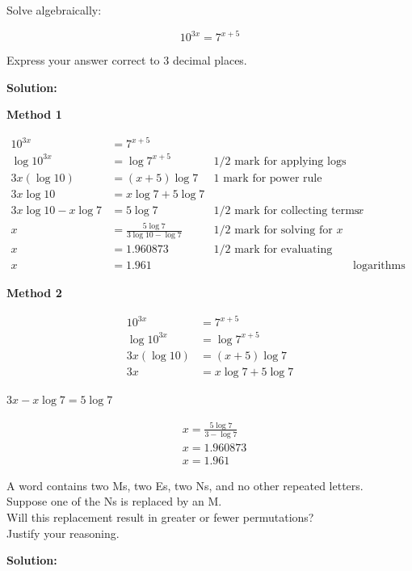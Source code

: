 \documentclass[12pt,addpoints,answers]{exam}
\begin{document}
\begin{questions}
\question
\leavevmode
Solve algebraically:

$$
10^{3 x}=7^{x+5}
$$

Express your answer correct to 3 decimal places.
\begin{solution}
\textbf{Solution:}\par

\textbf{Method 1}\par
$$
\begin{array}{rlrl}
10^{3 x} & =7^{x+5} & \\
\log 10^{3 x} & =\log 7^{x+5} & 1 / 2 \text { mark for applying logs } \\
3 x(\log 10) & =(x+5) \log 7 & 1 \text { mark for power rule } & \\
3 x \log 10 & =x \log 7+5 \log 7 & & \\
3 x \log 10-x \log 7 & =5 \log 7 & 1 / 2 \text { mark for collecting terms with } x & \\
x & =\frac{5 \log 7}{3 \log 10-\log 7} & 1 / 2 \text { mark for solving for } x \\
x & =1.960873 & 1 / 2 \text { mark for evaluating quotient of } \\
x & =1.961 & & \text { logarithms }
\end{array}
$$


\textbf{Method 2}\par
$$
\begin{aligned}
10^{3 x} & =7^{x+5} \\
\log 10^{3 x} & =\log 7^{x+5} \\
3 x(\log 10) & =(x+5) \log 7 \\
3 x & =x \log 7+5 \log 7
\end{aligned}
$$

$3 x-x \log 7=5 \log 7$

$$
\begin{aligned}
& x=\frac{5 \log 7}{3-\log 7} \\
& x=1.960873 \\
& x=1.961
\end{aligned}
$$
\end{solution}

\question
\leavevmode
A word contains two Ms, two Es, two Ns, and no other repeated letters.\\
Suppose one of the Ns is replaced by an M.\\
Will this replacement result in greater or fewer permutations?\\
Justify your reasoning.
\begin{solution}
\textbf{Solution:}\par


\end{solution}
\end{questions}
\end{document}
